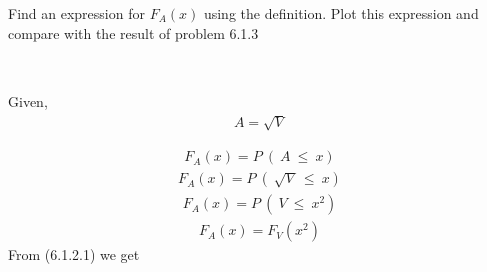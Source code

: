 







Find an expression for $F_A(x)$ using the definition. Plot this expression and compare with the result of problem 6.1.3
\subsection*{}\\
Given,
\begin{align}
A = \sqrt{V}
\end{align}

\begin{align} F_A(x) = P\ (\ A\ \leq\ x)\end{align}
\begin{align} F_A(x) = P\ (\ \sqrt{V}\ \leq\ x)\end{align}
\begin{align} F_A(x) = P\ (\ V\ \leq\ x^2)\end{align}
\begin{align} F_A(x) = F_V(x^2)\end{align}
From (6.1.2.1) we get\\

